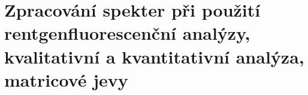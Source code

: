 \section[Aplikace rentgnofluorescenční analýzi]{Zpracování spekter při použití rentgenfluorescenční analýzy, kvalitativní a kvantitativní analýza, matricové jevy}

